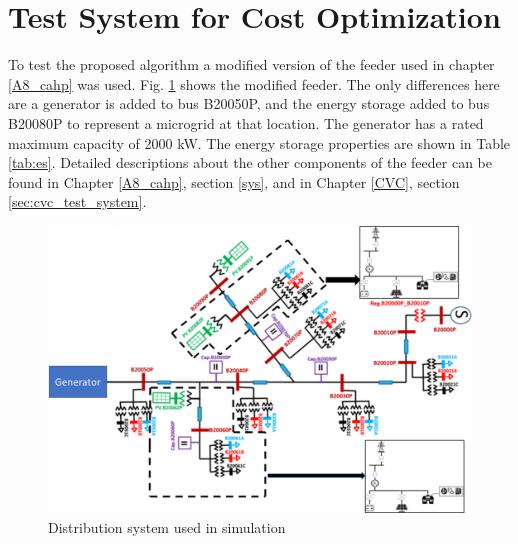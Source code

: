 \section{Test System for Cost Optimization}
To test the proposed algorithm a modified version of the feeder used in chapter \ref{A8_cahp} was used. Fig. \ref{fig:modified_feeder_2} shows the modified feeder. The only differences here are a generator is added to bus B20050P, and the energy storage added to bus B20080P to represent a microgrid at that location. The generator has a rated maximum capacity of 2000 kW. The energy storage properties are shown in Table \ref{tab:es}. Detailed descriptions about the other components of the feeder can be found in Chapter \ref{A8_cahp}, section \ref{sys}, and in Chapter \ref{CVC}, section \ref{sec:cvc_test_system}.
\begin{figure}[!ht]
\centering
\includegraphics[width = \linewidth]{figs/A82/modified_feeder_2.png}
\caption{Distribution system used in simulation}
\label{fig:modified_feeder_2}
\end{figure}

